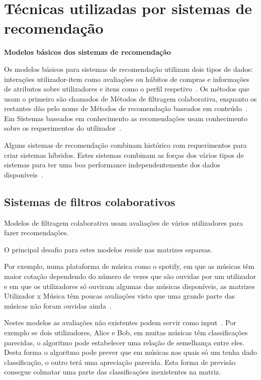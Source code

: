 \section{Técnicas utilizadas por sistemas de recomendação}

\begin{center}
\normalsize{\bfseries Modelos básicos dos sistemas de recomendação}\hfill
\end{center}
\par\hfill
\par Os modelos básicos para sistemas de recomendação utilizam dois tipos de dados: interações utilizador-item como avaliações ou hábitos de compras e informações de atributos sobre utilizadores e itens como o perfil respetivo~\cite{ref_book1}. Os métodos que usam o primeiro são chamados de Métodos de filtragem colaborativa, enquanto os restantes dão pelo nome de Métodos de recomendação baseados em conteúdo~\cite{ref_book1}. Em Sistemas baseados em conhecimento as recomendações usam conhecimento sobre os requerimentos do utilizador~\cite{ref_book1}.
\par Alguns sistemas de recomendação combinam histórico com requerimentos para criar sistemas híbridos. Estes sistemas combinam as forças dos vários tipos de sistemas para ter uma boa performance independentemente dos dados disponíveis~\cite{ref_book1}.
\hfill

\subsection{Sistemas de filtros colaborativos}
\par\hfill
\par Modelos de filtragem colaborativa usam avaliações de vários utilizadores para fazer recomendações.

\par O principal desafio para estes modelos reside nas matrizes esparsas.

\par Por exemplo, numa plataforma de música como o spotify, em que as músicas têm maior cotação dependendo do número de vezes que são ouvidas por um utilizador e em que os utilizadores só ouviram algumas das músicas disponíveis, as matrizes Utilizador x Música têm poucas avaliações visto que uma grande parte das músicas não foram ouvidas ainda~\cite{ref_book2}.

\par Nestes modelos as avaliações não existentes podem servir como input~\cite{ref_book1}. Por exemplo se dois utilizadores, Alice e Bob, em muitas músicas têm classificações parecidas, o algoritmo pode estabelecer uma relação de semelhança entre eles. Desta forma o algoritmo pode prever que em músicas nas quais só um tenha dado classificação, o outro terá uma apreciação parecida. Esta forma de previsão consegue colmatar uma parte das classificações inexistentes na matriz.


